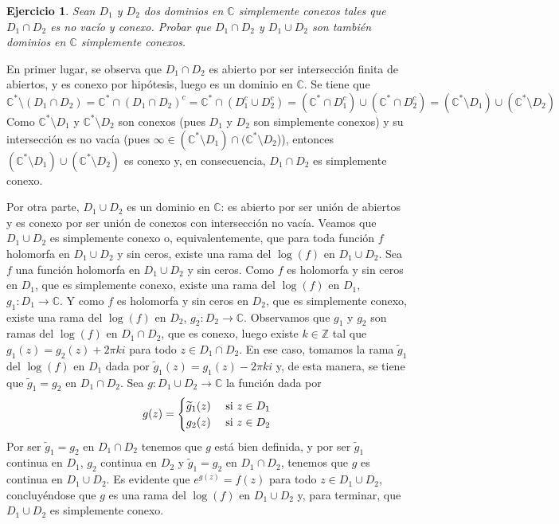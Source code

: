 \documentclass[11pt]{report}
\makeatletter
\renewenvironment{proof}[1][\proofname]{\par
  \pushQED{\qed}%
  \normalfont \topsep\z@skip %
  \trivlist
  \item[\hskip\labelsep
        \itshape
    #1\@addpunct{.}]\ignorespaces
}{%
  \popQED\endtrivlist\@endpefalse
}
\newcommand{\Z}{\mathbb Z}
\newcommand{\C}{\mathbb C}
\newtheorem{ejercicio}{Ejercicio}
\makeatother
\begin{document}
\begin{ejercicio}
  Sean $D_1$ y $D_2$ dos dominios en $\C$ simplemente conexos tales que $D_1 \cap D_2$ es no vacío y conexo. Probar que $D_1 \cap D_2$ y $D_1 \cup D_2$ son también dominios en $\C$ simplemente conexos.
\end{ejercicio}

\begin{proof}
  En primer lugar, se observa que $D_1 \cap D_2$ es abierto por ser intersección finita de abiertos, y es conexo por hipótesis, luego es un dominio en $\C$. Se tiene que
  \[\C^* \setminus (D_1 \cap D_2) = \C^* \cap (D_1 \cap D_2)^c = \C^* \cap (D_1^c \cup D_2^c) = (\C^* \cap D_1^c) \cup (\C^* \cap D_2^c) = (\C^* \setminus D_1) \cup (\C^* \setminus D_2)\]
  Como $\C^* \setminus D_1$ y $\C^* \setminus D_2$ son conexos (pues $D_1$ y $D_2$ son simplemente conexos) y su intersección es no vacía (pues $\infty \in (\C^* \setminus D_1) \cap(\C^* \setminus D_2$)), entonces $(\C^* \setminus D_1) \cup (\C^* \setminus D_2)$ es conexo y, en consecuencia, $D_1 \cap D_2$ es simplemente conexo.

  Por otra parte, $D_1 \cup D_2$ es un dominio en $\C$: es abierto por ser unión de abiertos y es conexo por ser unión de conexos con intersección no vacía. Veamos que $D_1 \cup D_2$ es simplemente conexo o, equivalentemente, que para toda función $f$ holomorfa en $D_1 \cup D_2$ y sin ceros, existe una rama del $\log(f)$ en $D_1 \cup D_2$. Sea $f$ una función holomorfa en $D_1 \cup D_2$ y sin ceros. Como $f$ es holomorfa y sin ceros en $D_1$, que es simplemente conexo, existe una rama del $\log(f)$ en $D_1$, $g_1 \colon D_1 \to \C$. Y como $f$ es holomorfa y sin ceros en $D_2$, que es simplemente conexo, existe una rama del $\log(f)$ en $D_2$, $g_2 \colon D_2 \to \C$. Observamos que $g_1$ y $g_2$ son ramas del $\log(f)$ en $D_1 \cap D_2$, que es conexo, luego existe $k \in \Z$ tal que $g_1(z)=g_2(z)+2\pi ki$ para todo $z \in D_1 \cap D_2$. En ese caso, tomamos la rama $\widetilde{g}_1$ del $\log(f)$ en $D_1$ dada por $\widetilde{g}_1(z)=g_1(z)-2\pi ki$ y, de esta manera, se tiene que $\widetilde{g}_1 = g_2$ en $D_1 \cap D_2$. Sea $g \colon D_1 \cup D_2 \to \C$ la función dada por
  \[g(z)=\begin{cases}
    \widetilde{g}_1(z) & $ si $ z \in D_1 \\
    g_2(z) & $ si $ z \in D_2
  \end{cases}\]
  Por ser $\widetilde{g}_1 = g_2$ en $D_1 \cap D_2$ tenemos que $g$ está bien definida, y por ser $\widetilde{g}_1$ continua en $D_1$, $g_2$ continua en $D_2$ y $\widetilde{g}_1 = g_2$ en $D_1 \cap D_2$, tenemos que $g$ es continua en $D_1 \cup D_2$. Es evidente que $e^{g(z)} = f(z)$ para todo $z \in D_1 \cup D_2$, concluyéndose que $g$ es una rama del $\log(f)$ en $D_1 \cup D_2$ y, para terminar, que $D_1 \cup D_2$ es simplemente conexo.
 \end{proof}
\end{document}
